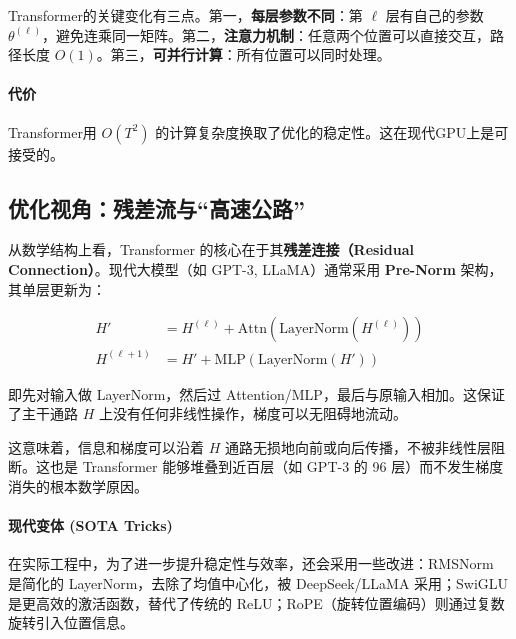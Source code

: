 Transformer的关键变化有三点。第一，\textbf{每层参数不同}：第 $\ell$ 层有自己的参数 $\theta^{(\ell)}$，避免连乘同一矩阵。第二，\textbf{注意力机制}：任意两个位置可以直接交互，路径长度 $O(1)$。第三，\textbf{可并行计算}：所有位置可以同时处理。

\paragraph{代价}

Transformer用 $O(T^2)$ 的计算复杂度换取了优化的稳定性。这在现代GPU上是可接受的。

\subsection{优化视角：残差流与“高速公路”}

从数学结构上看，Transformer 的核心在于其\textbf{残差连接（Residual Connection）}。现代大模型（如 GPT-3, LLaMA）通常采用 \textbf{Pre-Norm} 架构，其单层更新为：

\begin{align}
    H' &= H^{(\ell)} + \text{Attn}(\text{LayerNorm}(H^{(\ell)})) \\
    H^{(\ell+1)} &= H' + \text{MLP}(\text{LayerNorm}(H'))
\end{align}

即先对输入做 LayerNorm，然后过 Attention/MLP，最后与原输入相加。这保证了主干通路 $H$ 上没有任何非线性操作，梯度可以无阻碍地流动。


这意味着，信息和梯度可以沿着 $H$ 通路无损地向前或向后传播，不被非线性层阻断。这也是 Transformer 能够堆叠到近百层（如 GPT-3 的 96 层）而不发生梯度消失的根本数学原因。

\paragraph{现代变体 (SOTA Tricks)}
在实际工程中，为了进一步提升稳定性与效率，还会采用一些改进：RMSNorm 是简化的 LayerNorm，去除了均值中心化，被 DeepSeek/LLaMA 采用；SwiGLU 是更高效的激活函数，替代了传统的 ReLU；RoPE（旋转位置编码）则通过复数旋转引入位置信息。

